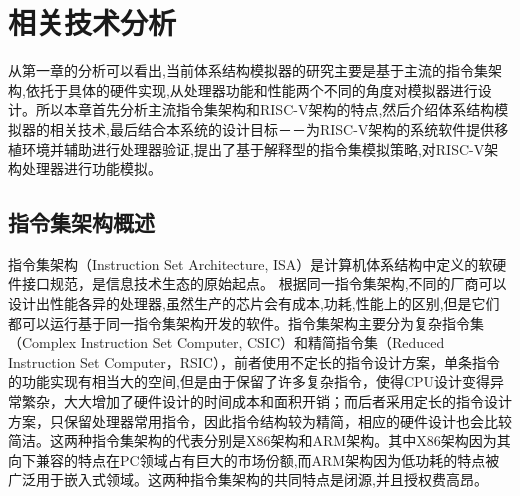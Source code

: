 
\chapter{相关技术分析}

从第一章的分析可以看出,当前体系结构模拟器的研究主要是基于主流的指令集架构,依托于具体的硬件实现,从处理器功能和性能两个不同的角度对模拟器进行设计。所以本章首先分析主流指令集架构和RISC-V架构的特点,然后介绍体系结构模拟器的相关技术,最后结合本系统的设计目标－－为RISC-V架构的系统软件提供移植环境并辅助进行处理器验证,提出了基于解释型的指令集模拟策略,对RISC-V架构处理器进行功能模拟。

\section{指令集架构概述}

指令集架构（Instruction Set Architecture, ISA）是计算机体系结构中定义的软硬件接口规范，是信息技术生态的原始起点\cite{刘畅2021risc}。
根据同一指令集架构,不同的厂商可以设计出性能各异的处理器,虽然生产的芯片会有成本,功耗,性能上的区别,但是它们都可以运行基于同一指令集架构开发的软件。指令集架构主要分为复杂指令集（Complex Instruction Set Computer, CSIC）和精简指令集（Reduced Instruction Set Computer，RSIC），前者使用不定长的指令设计方案，单条指令的功能实现有相当大的空间,但是由于保留了许多复杂指令，使得CPU设计变得异常繁杂，大大增加了硬件设计的时间成本和面积开销；而后者采用定长的指令设计方案，只保留处理器常用指令，因此指令结构较为精简，相应的硬件设计也会比较简洁。这两种指令集架构的代表分别是X86架构和ARM架构。其中X86架构因为其向下兼容的特点在PC领域占有巨大的市场份额,而ARM架构因为低功耗的特点被广泛用于嵌入式领域。这两种指令集架构的共同特点是闭源,并且授权费高昂。



